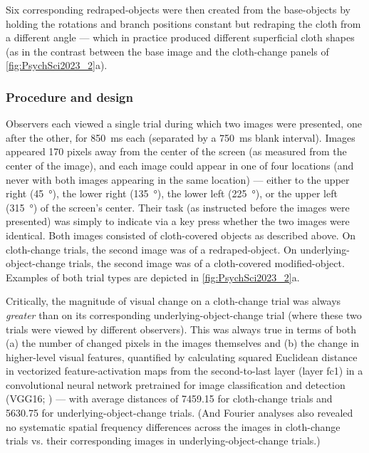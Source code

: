 Six corresponding redraped-objects were then created from the base-objects by holding the rotations and branch positions constant but redraping the cloth from a different angle --- which in practice produced different superficial cloth shapes (as in the contrast between the base image and the cloth-change panels of \cref{fig:PsychSci2023_2}a).

\subsubsection{Procedure and design}

Observers each viewed a single trial during which two images were presented, one after the other, for \qty{850}{\milli\second} each (separated by a \qty{750}{\milli\second} blank interval). Images appeared 170 pixels away from the center of the screen (as measured from the center of the image), and each image could appear in one of four locations (and never with both images appearing in the same location) --- either to the upper right (\qty{45}{\degree}), the lower right (\qty{135}{\degree}), the lower left (\qty{225}{\degree}), or the upper left (\qty{315}{\degree}) of the screen’s center. Their task (as instructed before the images were presented) was simply to indicate via a key press whether the two images were identical. Both images consisted of cloth-covered objects as described above. On cloth-change trials, the second image was of a redraped-object. On underlying-object-change trials, the second image was of a cloth-covered modified-object. Examples of both trial types are depicted in \cref{fig:PsychSci2023_2}a.

Critically, the magnitude of visual change on a cloth-change trial was always \textit{greater} than on its corresponding underlying-object-change trial (where these two trials were viewed by different observers). This was always true in terms of both (a) the number of changed pixels in the images themselves and (b) the change in higher-level visual features, quantified by calculating squared Euclidean distance in vectorized feature-activation maps from the second-to-last layer (layer fc1) in a convolutional neural network pretrained for image classification and detection (VGG16; \cite{simonyan_very_2015}) --- with average distances of \num{7459.15} for cloth-change trials and \num{5630.75} for underlying-object-change trials. (And Fourier analyses also revealed no systematic spatial frequency differences across the images in cloth-change trials vs. their corresponding images in underlying-object-change trials.)

